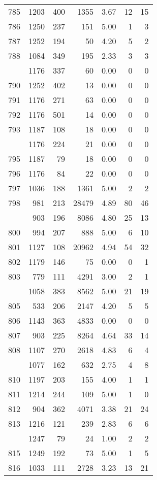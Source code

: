 \documentclass[
]{article}
\begin{document}
\begin{table}
\begin{tabular}[t]{lrrrrrr}
785 & 1203 & 400 & 1355 & 3.67 & 12 & 15\\
786 & 1250 & 237 & 151 & 5.00 & 1 & 3\\
787 & 1252 & 194 & 50 & 4.20 & 5 & 2\\
788 & 1084 & 349 & 195 & 2.33 & 3 & 3\\
\addlinespace
789 & 1176 & 337 & 60 & 0.00 & 0 & 0\\
790 & 1252 & 402 & 13 & 0.00 & 0 & 0\\
791 & 1176 & 271 & 63 & 0.00 & 0 & 0\\
792 & 1176 & 501 & 14 & 0.00 & 0 & 0\\
793 & 1187 & 108 & 18 & 0.00 & 0 & 0\\
\addlinespace
794 & 1176 & 224 & 21 & 0.00 & 0 & 0\\
795 & 1187 & 79 & 18 & 0.00 & 0 & 0\\
796 & 1176 & 84 & 22 & 0.00 & 0 & 0\\
797 & 1036 & 188 & 1361 & 5.00 & 2 & 2\\
798 & 981 & 213 & 28479 & 4.89 & 80 & 46\\
\addlinespace
799 & 903 & 196 & 8086 & 4.80 & 25 & 13\\
800 & 994 & 207 & 888 & 5.00 & 6 & 10\\
801 & 1127 & 108 & 20962 & 4.94 & 54 & 32\\
802 & 1179 & 146 & 75 & 0.00 & 0 & 1\\
803 & 779 & 111 & 4291 & 3.00 & 2 & 1\\
\addlinespace
804 & 1058 & 383 & 8562 & 5.00 & 21 & 19\\
805 & 533 & 206 & 2147 & 4.20 & 5 & 5\\
806 & 1143 & 363 & 4833 & 0.00 & 0 & 0\\
807 & 903 & 225 & 8264 & 4.64 & 33 & 14\\
808 & 1107 & 270 & 2618 & 4.83 & 6 & 4\\
\addlinespace
809 & 1077 & 162 & 632 & 2.75 & 4 & 8\\
810 & 1197 & 203 & 155 & 4.00 & 1 & 1\\
811 & 1214 & 244 & 109 & 5.00 & 1 & 0\\
812 & 904 & 362 & 4071 & 3.38 & 21 & 24\\
813 & 1216 & 121 & 239 & 2.83 & 6 & 6\\
\addlinespace
814 & 1247 & 79 & 24 & 1.00 & 2 & 2\\
815 & 1249 & 192 & 73 & 5.00 & 1 & 5\\
816 & 1033 & 111 & 2728 & 3.23 & 13 & 21\\

\end{tabular}
\end{table}
\end{document}
